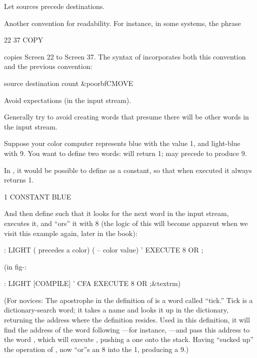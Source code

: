 \begin{tip}
Let sources precede destinations.
\end{tip}
Another convention for readability. For instance, in some systems, the
phrase
\begin{Code}
22 37 COPY
\end{Code}
copies Screen 22 to Screen 37. The syntax of  incorporates both
this convention and the previous convention:
\begin{Code}[commandchars=\&\{\}]
source destination count &poorbf{CMOVE}
\end{Code}

\begin{tip}
Avoid expectations (in the input stream).
\end{tip}
Generally try to avoid creating words that presume there will be other
words in the input stream.

Suppose your color computer represents blue with the value 1, and
light-blue with 9. You want to define two words:  will return
1;  may precede  to produce 9.

In \Forth{}, it would be possible to define  as a constant, so
that when executed it always returns 1.

\begin{Code}
1 CONSTANT BLUE
\end{Code}
And then define  such that it looks for the next word in the
input stream, executes it, and ``ors'' it with 8 (the logic of this will
become apparent when we visit this example again, later in the book):
\begin{Code}
: LIGHT  ( precedes a color)  ( -- color value)
     ' EXECUTE  8 OR ;
\end{Code}
(in fig-\Forth{}:
\begin{Code}[commandchars=\&\{\}]
: LIGHT [COMPILE] '  CFA EXECUTE  8 OR ;&textrm{)}
\end{Code}
\noindent (For novices: The apostrophe in the definition of 
is a \Forth{} word called ``tick.'' Tick is a dictionary-search word; it
takes a name and looks it up in the dictionary, returning the address
where the definition resides. Used in this definition, it will find the
address of the word following ---for instance,
---and pass this address to the word , which
will execute , pushing a one onto the stack.  Having ``sucked
up'' the operation of ,  now ``or''s an 8 into
the 1, producing a 9.)

